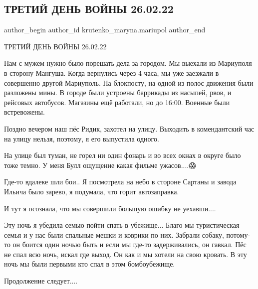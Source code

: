  
 
 
 
 

\subsection{ТРЕТИЙ ДЕНЬ ВОЙНЫ 26.02.22}
\label{sec:26_02_2023.fb.krutenko_maryna.mariupol.1.tretii_den_voini_26_}

\ifcmt
 author_begin
   author_id krutenko_maryna.mariupol
 author_end
\fi

ТРЕТИЙ ДЕНЬ ВОЙНЫ 26.02.22

Нам с мужем нужно было порешать дела за городом. Мы выехали из Мариуполя в
сторону Мангуша. Когда вернулись через 4 часа, мы уже заезжали в совершенно
другой Мариуполь. На блокпосту, на одной из полос движения были разложены мины.
В городе были устроены баррикады из насыпей, рвов, и рейсовых автобусов.
Магазины ещё работали, но до 16:00. Военные были встревожены.  

Поздно вечером наш пёс Ридик, захотел на улицу. Выходить в комендантский час на
улицу нельзя, поэтому, я его выпустила одного. 

На улице был туман, не горел ни один фонарь и во всех окнах в округе было тоже
темно.  У меня Булл ощущение какая фильме ужасов....😱

Где-то вдалеке шли бои.. Я посмотрела на небо в стороне Сартаны и завода Ильича
было зарево, я подумала, что горит автозаправка. 

И тут я осознала, что  мы совершили большую ошибку не уехавши.... 

Эту ночь я убедила семью пойти спать в убежище... Благо мы туристическая семья и
у нас были спальные мешки и коврики по них. Забрали собаку, потому-то он боится
один ночью быть и если мы где-то задерживались, он гавкал.  Пёс не спал всю
ночь, искал где выход. Он как и мы хотели на свою кровать. В эту ночь мы были
первыми кто спал в этом бомбоубежище. 

Продолжение следует....
